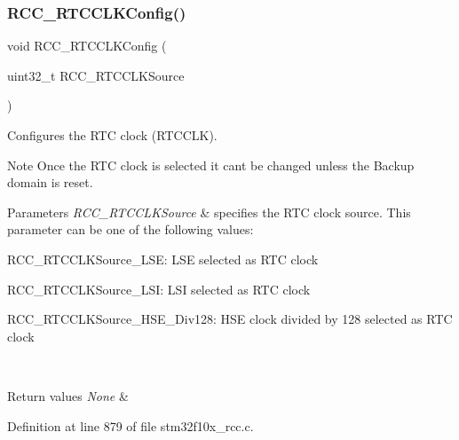 \subsubsection{\texorpdfstring{R\+C\+C\+\_\+\+R\+T\+C\+C\+L\+K\+Config()}{RCC\_RTCCLKConfig()}}
{\footnotesize\ttfamily void R\+C\+C\+\_\+\+R\+T\+C\+C\+L\+K\+Config (\begin{DoxyParamCaption}\item[{uint32\+\_\+t}]{R\+C\+C\+\_\+\+R\+T\+C\+C\+L\+K\+Source }\end{DoxyParamCaption})}



Configures the R\+TC clock (R\+T\+C\+C\+LK). 

\begin{DoxyNote}{Note}
Once the R\+TC clock is selected it can\textquotesingle{}t be changed unless the Backup domain is reset. 
\end{DoxyNote}

\begin{DoxyParams}{Parameters}
{\em R\+C\+C\+\_\+\+R\+T\+C\+C\+L\+K\+Source} & specifies the R\+TC clock source. This parameter can be one of the following values\+: \begin{DoxyItemize}
\item R\+C\+C\+\_\+\+R\+T\+C\+C\+L\+K\+Source\+\_\+\+L\+SE\+: L\+SE selected as R\+TC clock \item R\+C\+C\+\_\+\+R\+T\+C\+C\+L\+K\+Source\+\_\+\+L\+SI\+: L\+SI selected as R\+TC clock \item R\+C\+C\+\_\+\+R\+T\+C\+C\+L\+K\+Source\+\_\+\+H\+S\+E\+\_\+\+Div128\+: H\+SE clock divided by 128 selected as R\+TC clock \end{DoxyItemize}
\\
\hline
\end{DoxyParams}

\begin{DoxyRetVals}{Return values}
{\em None} & \\
\hline
\end{DoxyRetVals}


Definition at line 879 of file stm32f10x\+\_\+rcc.\+c.

\mbox{\label{group___r_c_c___exported___functions_ga3551a36a8f0a3dc96a74d6b939048337}} 
